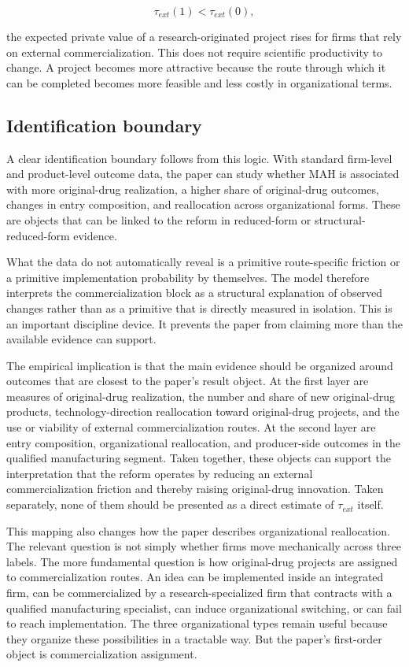 \documentclass[12pt]{article}
\begin{document}
\[
\tau_{ext}(1) < \tau_{ext}(0),
\]

the expected private value of a research-originated project rises for firms that rely on external commercialization. This does not require scientific productivity to change. A project becomes more attractive because the route through which it can be completed becomes more feasible and less costly in organizational terms.

\subsection{Identification boundary}

A clear identification boundary follows from this logic. With standard firm-level and product-level outcome data, the paper can study whether MAH is associated with more original-drug realization, a higher share of original-drug outcomes, changes in entry composition, and reallocation across organizational forms. These are objects that can be linked to the reform in reduced-form or structural-reduced-form evidence.

What the data do not automatically reveal is a primitive route-specific friction or a primitive implementation probability by themselves. The model therefore interprets the commercialization block as a structural explanation of observed changes rather than as a primitive that is directly measured in isolation. This is an important discipline device. It prevents the paper from claiming more than the available evidence can support.

The empirical implication is that the main evidence should be organized around outcomes that are closest to the paper's result object. At the first layer are measures of original-drug realization, the number and share of new original-drug products, technology-direction reallocation toward original-drug projects, and the use or viability of external commercialization routes. At the second layer are entry composition, organizational reallocation, and producer-side outcomes in the qualified manufacturing segment. Taken together, these objects can support the interpretation that the reform operates by reducing an external commercialization friction and thereby raising original-drug innovation. Taken separately, none of them should be presented as a direct estimate of $\tau_{ext}$ itself.

This mapping also changes how the paper describes organizational reallocation. The relevant question is not simply whether firms move mechanically across three labels. The more fundamental question is how original-drug projects are assigned to commercialization routes. An idea can be implemented inside an integrated firm, can be commercialized by a research-specialized firm that contracts with a qualified manufacturing specialist, can induce organizational switching, or can fail to reach implementation. The three organizational types remain useful because they organize these possibilities in a tractable way. But the paper's first-order object is commercialization assignment.
\end{document}
